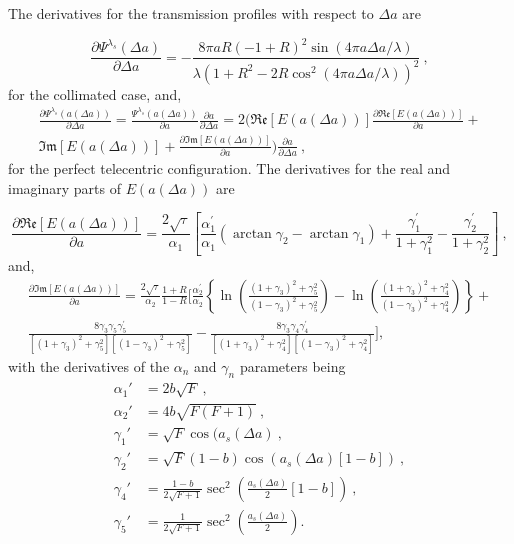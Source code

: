 \documentclass[12pt]{mythesis}
\begin{document}
The derivatives for the transmission profiles with respect to $\Delta a$ are

\begin{equation}
    \frac{\partial \Psi ^{\lambda _ s} (\Delta a)}{\partial \Delta a} = - \frac{8\pi a R(-1 + R) ^2 \sin (4 \pi a \Delta a/ \lambda)}{\lambda \left( 1 + R  ^2 - 2  R  \cos ^2 (4 \pi a \Delta a/ \lambda)\right) ^2} \ ,
\end{equation}
for the collimated case, and,
\begin{multline}
    \frac{\partial \Psi ^{\lambda _ s} (a (\Delta a))}{\partial \Delta a} = \frac{ \Psi ^{\lambda _ s} (a (\Delta a))}{\partial a} \frac{\partial a}{\partial \Delta a} = 2\Biggl( \mathfrak{Re}\left[E(a (\Delta a)) \right] \frac{\partial  \mathfrak{Re}\left[E(a (\Delta a)) \right]}{\partial a} + \\
    \mathfrak{Im}\left[E(a (\Delta a))\right] + \frac{\partial \mathfrak{Im}\left[E(a (\Delta a))\right]}{\partial a} \Biggr) \frac{\partial a}{\partial \Delta a}\ ,
\end{multline}
for the perfect telecentric configuration. The derivatives for the real and imaginary parts of $E(a(\Delta a))$ are

\begin{equation}
\frac{\partial  \mathfrak{Re}\left[E(a (\Delta a))\right]}{\partial a}=\frac{2 \sqrt{\tau}}{\alpha_1}\left[\frac{\alpha_1^{\prime}}{\alpha_1}\left(\arctan \gamma_2-\arctan \gamma_1\right)+\frac{\gamma_1^{\prime}}{1+\gamma_1^2}-\frac{\gamma_2^{\prime}}{1+\gamma_2^2}\right] \ ,
\end{equation}
and,
\begin{multline}
\frac{\partial  \mathfrak{Im}\left[E(a (\Delta a))\right]}{\partial a}=\frac{2 \sqrt{\tau}}{\alpha_2} \frac{1+R}{1-R}\Biggl[\frac{\alpha_2^{\prime}}{\alpha_2}\left\{\ln \left(\frac{\left(1+\gamma_3\right)^2+\gamma_5^2}{\left(1-\gamma_3\right)^2+\gamma_5^2}\right)-\ln \left(\frac{\left(1+\gamma_3\right)^2+\gamma_4^2}{\left(1-\gamma_3\right)^2+\gamma_4^2}\right)\right\}+\\
\frac{8 \gamma_3 \gamma_5 \gamma_5^{\prime}}{\left[\left(1+\gamma_3\right)^2+\gamma_5^2\right]\left[\left(1-\gamma_3\right)^2+\gamma_5^2\right]}- \frac{8 \gamma_3 \gamma_4 \gamma_4^{\prime}}{\left[\left(1+\gamma_3\right)^2+\gamma_4^2\right]\left[\left(1-\gamma_3\right)^2+\gamma_4^2\right]}\Biggr] ,
\end{multline}
with the derivatives of the $\alpha _ n$ and $\gamma _ n$ parameters being
\begin{equation}
\begin{split}
\alpha _1 ' &= 2 b \sqrt{F} \ , \\
\alpha _ 2 '  &= 4 b\sqrt{F (F + 1)}\ ,  \\
\gamma _ 1 ' &=\sqrt{F} \cos (a_s(\Delta a)\ , \\
\gamma _ 2 ' &= \sqrt{F} (1 - b) \cos (a_s(\Delta a) [1 - b])\ , \\
\gamma _ 4 ' &= \frac{1 - b}{2 \sqrt{F + 1}} \sec ^2 \left( \frac{a_s(\Delta a)}{2}[1 - b] \right) \ ,  \\
\gamma _ 5 ' &= \frac{1}{2 \sqrt{F + 1}}\sec ^2 \left(\frac{a_s(\Delta a)}{2}\right).
\end{split}
\end{equation}





\cleardoublepage
\end{document}
